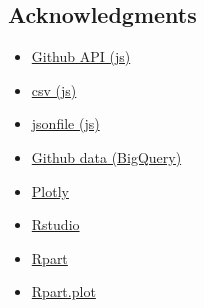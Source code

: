 \documentclass[11pt]{article}
\providecommand{\tightlist}{%
      \setlength{\itemsep}{0pt}\setlength{\parskip}{0pt}}
\begin{document}
    \subsection{Acknowledgments}\label{acknowledgments}

\begin{itemize}
\tightlist
\item
  \href{https://github.com/octokit/rest.js}{Github API (js)}
\item
  \href{https://www.npmjs.com/package/csv}{csv (js)}
\item
  \href{https://www.npmjs.com/package/jsonfile}{jsonfile (js)}
\item
  \href{https://bigquery.cloud.google.com/dataset/bigquery-public-data:github_repos}{Github
  data (BigQuery)}
\item
  \href{https://plot.ly/python/}{Plotly}
\item
  \href{https://www.rstudio.com/}{Rstudio}
\item
  \href{https://cran.r-project.org/web/packages/rpart/index.html}{Rpart}
\item
  \href{https://cran.r-project.org/web/packages/rpart.plot/index.html}{Rpart.plot}
\end{itemize}


    
    
    
    
\end{document}
